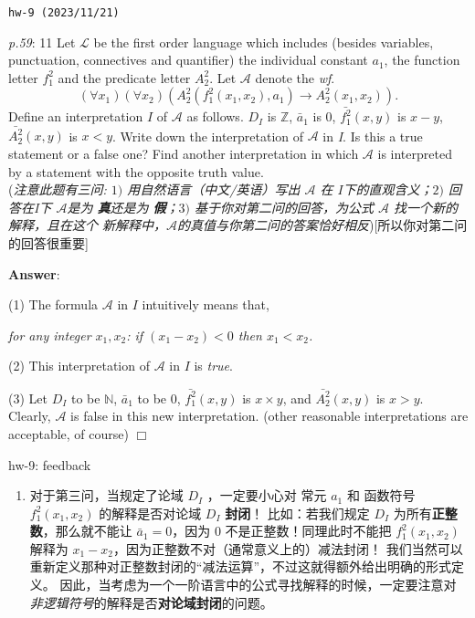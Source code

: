 \documentclass[UTF8,12pt,a4paper]{ctexart}
\begin{document}
\noindent\texttt{hw-9 (2023/11/21)}

\emph{p.59}: 11 \quad
Let $\mathscr{L}$ be the first order language which includes (besides variables, punctuation, 
connectives and quantifier) the individual constant $a_1$, the function letter $f^2_1$ and the predicate letter $A^2_2$. 
Let $\mathscr{A}$ denote the \textit{wf}.
\[
(\forall x_1)(\forall x_2)( A^2_2 ( f^2_1(x_1,x_2), a_1)  \to A^2_2 (x_1,x_2) ).
\]
Define an interpretation $I$ of $\mathscr{A}$ as follows. 
$D_I$ is $\mathbb{Z}$, $\bar{a}_1$ is $0$, $\bar{f^2_1} (x, y)$ is $x-y$, 
$\bar{A^2_2}(x,y)$ is $x < y$. 
Write down the interpretation of $\mathscr{A}$ in \textit{I}. 
Is this a true statement or a false one? 
Find another interpretation in which $\mathscr{A}$ is interpreted by a statement with the opposite truth value. \\
(\textit{注意此题有三问: $1)$ 用自然语言（中文/英语）写出 $\mathscr{A}$ 在 $I$下的直观含义；$2)$ 回答在\textit{I}下 $\mathscr{A}$是为\textbf{{\color{purple} 真}}还是为\textbf{{\color{purple} 假}}；$3)$ 基于你对第二问的回答，为公式 $\mathscr{A}$ 找一个新的解释，且在这个{\color{purple} 新}解释中，$\mathscr{A}$的真值与你第二问的答案恰好相反})[所以你对第二问的回答很重要]

\noindent\textbf{Answer}:   

(1) The formula $\mathscr{A}$ in $I$ intuitively means that, 

\hspace{6em} \textit{for any integer $x_1, x_2$: if  $(x_1 - x_2) < 0$ then $x_1 < x_2$.}


(2) This interpretation of $\mathscr{A}$ in $I$ is {\color{purple} \textit{true}}. 


(3) Let $D_I$ to be $\mathbb{N}$, $\bar{a}_1$ to be $0$, $\bar{f^2_1} (x, y)$ is $x \times y$, and $\bar{A^2_2}(x,y)$ is $x > y$. 
Clearly, $\mathscr{A}$ is {\color{purple} false} in this new interpretation. 
(other reasonable interpretations are acceptable, of course)
\hfill $\Box$


\vspace{1em}

\dotfill hw-9: feedback
\dotfill

\begin{enumerate}
	\item 对于第三问，当规定了论域 $D_I$ ，一定要小心对 常元 $a_1$ 和 函数符号 $f^2_1(x_1,x_2)$ 的解释是否对论域 $D_I$ {\color{red} \textbf{封闭}}！
	比如：若我们规定 $D_I$ 为所有\textbf{正整数}，那么就不能让 $\bar{a}_1 = 0$，因为 $0$ 不是正整数！同理此时不能把 $f^2_1(x_1,x_2)$ 解释为 $x_1 - x_2$，因为正整数不对（通常意义上的）减法封闭！
	我们当然可以重新定义那种对正整数封闭的“减法运算”，不过这就得额外给出明确的形式定义。
	因此，当考虑为一个一阶语言中的公式寻找解释的时候，一定要注意对{\color{purple} \textit{非逻辑符号}}的解释是否\textbf{对论域封闭}的问题。
\end{enumerate}
\end{document}
